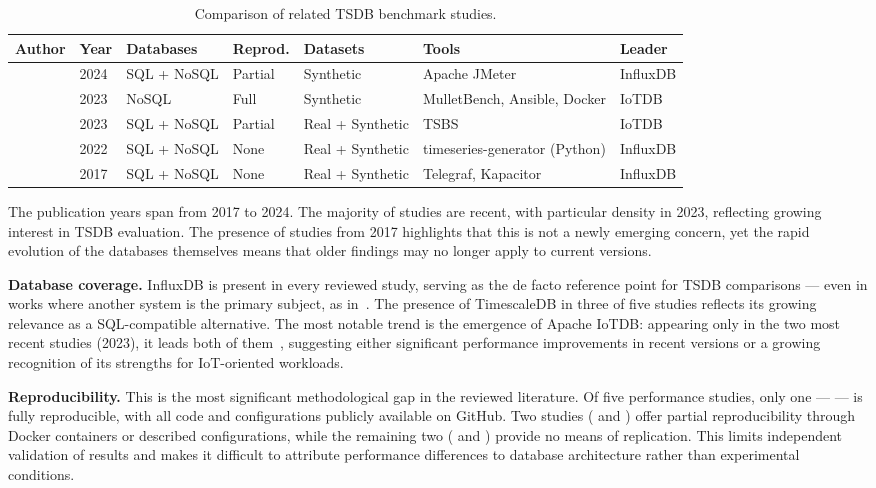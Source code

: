 \begin{table}[t]
  \centering
  \caption{Comparison of related TSDB benchmark studies.}
  \label{tab:related}
  \begin{tabular}{lllllll}
    \hline
    \textbf{Author} & \textbf{Year} & \textbf{Databases} & \textbf{Reprod.} & \textbf{Datasets} & \textbf{Tools} & \textbf{Leader} \\
    \hline
    \cite{lima2024avaliando}       & 2024 & SQL + NoSQL & Partial & Synthetic          & Apache JMeter                 & InfluxDB \\
    \cite{pereira2023mulletbench}  & 2023 & NoSQL       & Full    & Synthetic          & MulletBench, Ansible, Docker  & IoTDB    \\
    \cite{wang2023iotdb}           & 2023 & SQL + NoSQL & Partial & Real + Synthetic   & TSBS                          & IoTDB    \\
    \cite{shah2022performance}     & 2022 & SQL + NoSQL & None    & Real + Synthetic   & timeseries-generator (Python) & InfluxDB \\
    \cite{naqvi2017influxdb}       & 2017 & SQL + NoSQL & None    & Real + Synthetic   & Telegraf, Kapacitor            & InfluxDB \\
    \hline
  \end{tabular}
\end{table}

The publication years span from 2017 to 2024. The majority of studies are recent, with
particular density in 2023, reflecting growing interest in TSDB evaluation. The presence of
studies from 2017 highlights that this is not a newly emerging concern, yet the rapid evolution
of the databases themselves means that older findings may no longer apply to current versions.

\textbf{Database coverage.} InfluxDB is present in every reviewed study, serving as the de
facto reference point for TSDB comparisons --- even in works where another system is the
primary subject, as in~\cite{wang2023iotdb}. The presence of TimescaleDB in three of five
studies reflects its growing relevance as a SQL-compatible alternative. The most notable
trend is the emergence of Apache IoTDB: appearing only in the two most recent studies
(2023), it leads both of them~\cite{pereira2023mulletbench,wang2023iotdb}, suggesting
either significant performance improvements in recent versions or a growing recognition of
its strengths for IoT-oriented workloads.

\textbf{Reproducibility.} This is the most significant methodological gap in the reviewed
literature. Of five performance studies, only one --- \cite{pereira2023mulletbench} ---
is fully reproducible, with all code and configurations publicly available on GitHub.
Two studies (\cite{lima2024avaliando} and \cite{wang2023iotdb}) offer partial reproducibility
through Docker containers or described configurations, while the remaining two
(\cite{shah2022performance} and \cite{naqvi2017influxdb}) provide no means of replication.
This limits independent validation of results and makes it difficult to attribute performance
differences to database architecture rather than experimental conditions.

